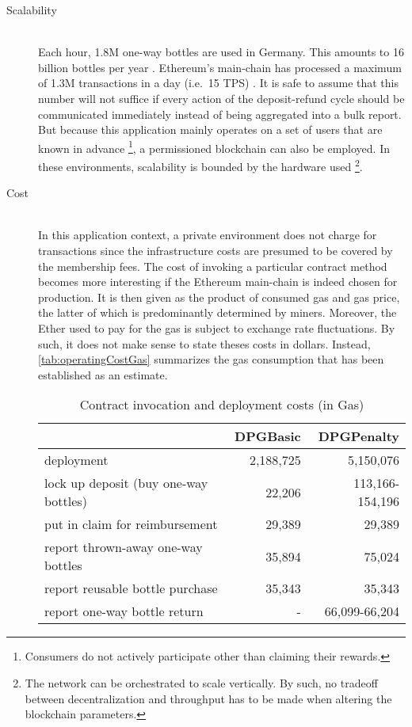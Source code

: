 \begin{description}
	\item[Scalability]
	\hfill \\
	Each hour, 1.8M one-way bottles are used in Germany. This amounts to 16 billion bottles per year \cite{DUHEinweg}. Ethereum's main-chain has processed a maximum of 1.3M transactions in a day (i.e.~15 TPS) \cite{etherscan}. It is safe to assume that this number will not suffice if every action of the deposit-refund cycle should be communicated immediately instead of being aggregated into a bulk report. But because this application mainly operates on a set of users that are known in advance \footnote{Consumers do not actively participate other than claiming their rewards.}, a permissioned blockchain can also be employed. In these environments, scalability is bounded by the hardware used \footnote{The network can be orchestrated to scale vertically. By such, no tradeoff between decentralization and throughput has to be made when altering the blockchain parameters.}. 
	
	\item[Cost]
	\hfill \\
	In this application context, a private environment does not charge for transactions since the infrastructure costs are presumed to be covered by the membership fees. The cost of invoking a particular contract method becomes more interesting if the Ethereum main-chain is indeed chosen for production. It is then given as the product of consumed gas and gas price, the latter of which is predominantly determined by miners. Moreover, the Ether used to pay for the gas is subject to exchange rate fluctuations. By such, it does not make sense to state theses costs in dollars. Instead, \autoref{tab:operatingCostGas} summarizes the gas consumption that has been established as an estimate.

	\begin{table}[hbt]
	\centering	
	\begin{tabular}{l|r|r}
    	& DPGBasic & DPGPenalty \\
    	\hline
    	deployment & 2,188,725 & 5,150,076 \\
    	\hline
    	lock up deposit (buy one-way bottles) & 22,206 & 113,166-154,196 \\ 
    	put in claim for reimbursement & 29,389 & 29,389 \\
    	report thrown-away one-way bottles & 35,894 & 75,024 \\
    	report reusable bottle purchase & 35,343 & 35,343 \\
    	\hline
    	report one-way bottle return & - & 66,099-66,204 \\
	\end{tabular}
	\caption[Contract invocation and deployment costs (in Gas)]{Contract invocation and deployment costs (in Gas) \footnotemark}
	\label{tab:operatingCostGas}
	\end{table}
	
	\FloatBarrier

\end{description}
  

